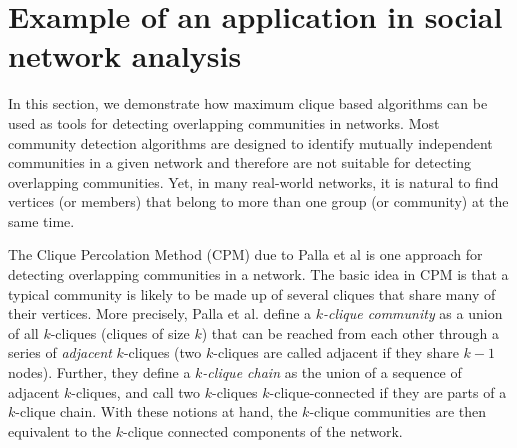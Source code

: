 \section{Example of an application in social network analysis}
\label{sec:applications}

In this section, we demonstrate how maximum clique based algorithms can be used as  tools for  
detecting overlapping communities in networks. 
Most community detection algorithms are designed to identify mutually independent communities 
in a given network and therefore are not suitable for detecting overlapping communities.
Yet, in many real-world networks, it is natural to find vertices (or members) that belong to more than 
one group (or community) at the same time.


The Clique Percolation Method (CPM) due to Palla et al \cite{Palla} is one approach for detecting overlapping communities in a network. The basic idea in CPM is that a typical community is likely to be made up of several cliques that share many of their vertices. More precisely, Palla et al. define
a {\em $k$-clique community} as a union of all $k$-cliques (cliques of size $k$) that can be reached from each other through a series of {\em adjacent} $k$-cliques 
(two $k$-cliques are called adjacent if they share $k - 1$ nodes). 
Further, they define a {\em $k$-clique chain} as the union of a sequence of adjacent $k$-cliques, and
call two $k$-cliques $k$-clique-connected if they are parts of a $k$-clique chain. With these notions at hand, the $k$-clique communities are then equivalent to the $k$-clique connected components
of the network.

